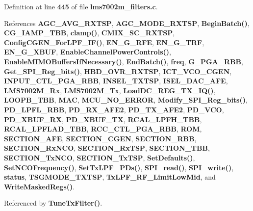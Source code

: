 Definition at line {\bf 445} of file {\bf lms7002m\+\_\+filters.\+c}.



References {\bf A\+G\+C\+\_\+\+A\+V\+G\+\_\+\+R\+X\+T\+SP}, {\bf A\+G\+C\+\_\+\+M\+O\+D\+E\+\_\+\+R\+X\+T\+SP}, {\bf Begin\+Batch()}, {\bf C\+G\+\_\+\+I\+A\+M\+P\+\_\+\+T\+BB}, {\bf clamp()}, {\bf C\+M\+I\+X\+\_\+\+S\+C\+\_\+\+R\+X\+T\+SP}, {\bf Config\+C\+G\+E\+N\+\_\+\+For\+L\+P\+F\+\_\+\+I\+F()}, {\bf E\+N\+\_\+\+G\+\_\+\+R\+FE}, {\bf E\+N\+\_\+\+G\+\_\+\+T\+RF}, {\bf E\+N\+\_\+\+G\+\_\+\+X\+B\+UF}, {\bf Enable\+Channel\+Power\+Controls()}, {\bf Enable\+M\+I\+M\+O\+Buffers\+If\+Necessary()}, {\bf End\+Batch()}, {\bf freq}, {\bf G\+\_\+\+P\+G\+A\+\_\+\+R\+BB}, {\bf Get\+\_\+\+S\+P\+I\+\_\+\+Reg\+\_\+bits()}, {\bf H\+B\+D\+\_\+\+O\+V\+R\+\_\+\+R\+X\+T\+SP}, {\bf I\+C\+T\+\_\+\+V\+C\+O\+\_\+\+C\+G\+EN}, {\bf I\+N\+P\+U\+T\+\_\+\+C\+T\+L\+\_\+\+P\+G\+A\+\_\+\+R\+BB}, {\bf I\+N\+S\+E\+L\+\_\+\+T\+X\+T\+SP}, {\bf I\+S\+E\+L\+\_\+\+D\+A\+C\+\_\+\+A\+FE}, {\bf L\+M\+S7002\+M\+\_\+\+Rx}, {\bf L\+M\+S7002\+M\+\_\+\+Tx}, {\bf Load\+D\+C\+\_\+\+R\+E\+G\+\_\+\+T\+X\+\_\+\+I\+Q()}, {\bf L\+O\+O\+P\+B\+\_\+\+T\+BB}, {\bf M\+AC}, {\bf M\+C\+U\+\_\+\+N\+O\+\_\+\+E\+R\+R\+OR}, {\bf Modify\+\_\+\+S\+P\+I\+\_\+\+Reg\+\_\+bits()}, {\bf P\+D\+\_\+\+L\+P\+F\+L\+\_\+\+R\+BB}, {\bf P\+D\+\_\+\+R\+X\+\_\+\+A\+F\+E2}, {\bf P\+D\+\_\+\+T\+X\+\_\+\+A\+F\+E2}, {\bf P\+D\+\_\+\+V\+CO}, {\bf P\+D\+\_\+\+X\+B\+U\+F\+\_\+\+RX}, {\bf P\+D\+\_\+\+X\+B\+U\+F\+\_\+\+TX}, {\bf R\+C\+A\+L\+\_\+\+L\+P\+F\+H\+\_\+\+T\+BB}, {\bf R\+C\+A\+L\+\_\+\+L\+P\+F\+L\+A\+D\+\_\+\+T\+BB}, {\bf R\+C\+C\+\_\+\+C\+T\+L\+\_\+\+P\+G\+A\+\_\+\+R\+BB}, {\bf R\+OM}, {\bf S\+E\+C\+T\+I\+O\+N\+\_\+\+A\+FE}, {\bf S\+E\+C\+T\+I\+O\+N\+\_\+\+C\+G\+EN}, {\bf S\+E\+C\+T\+I\+O\+N\+\_\+\+R\+BB}, {\bf S\+E\+C\+T\+I\+O\+N\+\_\+\+Rx\+N\+CO}, {\bf S\+E\+C\+T\+I\+O\+N\+\_\+\+Rx\+T\+SP}, {\bf S\+E\+C\+T\+I\+O\+N\+\_\+\+T\+BB}, {\bf S\+E\+C\+T\+I\+O\+N\+\_\+\+Tx\+N\+CO}, {\bf S\+E\+C\+T\+I\+O\+N\+\_\+\+Tx\+T\+SP}, {\bf Set\+Defaults()}, {\bf Set\+N\+C\+O\+Frequency()}, {\bf Set\+Tx\+L\+P\+F\+\_\+\+P\+Ds()}, {\bf S\+P\+I\+\_\+read()}, {\bf S\+P\+I\+\_\+write()}, {\bf status}, {\bf T\+S\+G\+M\+O\+D\+E\+\_\+\+T\+X\+T\+SP}, {\bf Tx\+L\+P\+F\+\_\+\+R\+F\+\_\+\+Limit\+Low\+Mid}, and {\bf Write\+Masked\+Regs()}.



Referenced by {\bf Tune\+Tx\+Filter()}.



